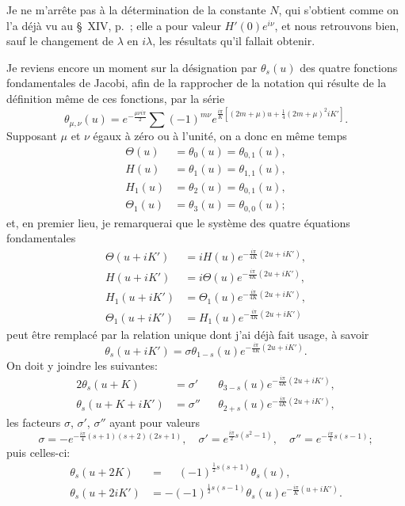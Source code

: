 \documentclass[11pt,leqno,oneside,letterpaper]{book}[2005/09/16]
\begin{document}
Je ne m'arr\^ete pas \`a la d\'etermination de la constante $N$, qui
s'obtient comme on l'a d\'ej\`a vu au \S~XIV, p.~\pageref{page31a};
elle a pour valeur $H'(0)e^{i\nu}$, et nous retrouvons bien, sauf le
changement de $\lambda$ en $i\lambda$, les r\'esultats qu'il fallait
obtenir.

Je reviens encore un moment sur la d\'esignation par $\theta_s(u)$ des quatre
fonctions fondamentales de Jacobi, afin de la rapprocher de la notation
qui r\'esulte de la d\'efinition m\^eme de ces fonctions, par la s\'erie
\[
  \theta_{\mu,\nu}(u) =
  e^{-\frac{\mu\nu i\pi}{2}}
  \sum (-1)^{m\nu}
    e^{\frac{i\pi}{K}\left[ (2m+\mu)u + \frac{1}{4}(2m+\mu)^2 iK' \right]} .
\]
Supposant $\mu$ et $\nu$ \'egaux \`a z\'ero ou \`a l'unit\'e, on a donc en m\^eme temps
\begin{align*}
  \Theta(u)  &= \theta_0 (u) = \theta_{0,1}(u), \\
   H    (u)  &= \theta_1 (u) = \theta_{1,1}(u), \\
   H_1  (u)  &= \theta_2 (u) = \theta_{0,1}(u), \\
  \Theta_1(u)&= \theta_3 (u) = \theta_{0,0}(u);
\end{align*}
et, en premier lieu, je remarquerai que le syst\`eme des quatre \'equations
fondamentales
\begin{align*}
  \Theta(u+iK') &=
    iH(u)       e^{-\frac{i\pi}{4K}(2u+iK')} , \\
  H     (u+iK') &=
    i\Theta(u)  e^{-\frac{i\pi}{4K}(2u+iK')} , \\
  H_1   (u+iK') &=
    \Theta_1(u)e^{-\frac{i\pi}{4K}(2u+iK')} , \\
 \Theta_1(u+iK')&=
    H_1(u)     e^{-\frac{i\pi}{4K}(2u+iK')}
\end{align*}
peut \^etre remplac\'e par la relation unique dont j'ai d\'ej\`a fait usage, \`a savoir
\[
  \theta_s (u+iK') = \sigma\theta_{1-s}(u)
    e^{-\frac{i\pi}{4K}(2u+iK')} .
\]
On doit y joindre les suivantes:
\begin{alignat*}{2}
  \theta_s(u+K) &=
    \sigma' &&\theta_{3-s}(u) e^{-\frac{i\pi}{4K}(2u+iK')} , \\
  \theta_s(u+K+iK') &=
    \sigma''&&\theta_{2+s}(u) e^{-\frac{i\pi}{4K}(2u+iK')} ,
\end{alignat*}
les facteurs $\sigma$, $\sigma'$, $\sigma''$ ayant pour valeurs
\[
\sigma   = -e^{-\frac{i \pi}{4}(s + 1)(s + 2)(2s + 1)}, \quad
\sigma'  =  e^{ \frac{i \pi}{2} s (s^2 -1)}, \quad
\sigma'' =  e^{-\frac{i \pi}{4} s (s - 1)};
\]
puis celles-ci:
\begin{align*}
\theta_s(u + 2K)    &= \phantom{-}(-1)^{\frac{1}{2}s(s+1)} \theta_s(u), \\
\theta_s(u + 2iK')  &=           -(-1)^{\frac{1}{2}s(s-1)} \theta_s(u) e^{-\frac{i\pi}{K}(u + iK')} .
\end{align*}
\end{document}
